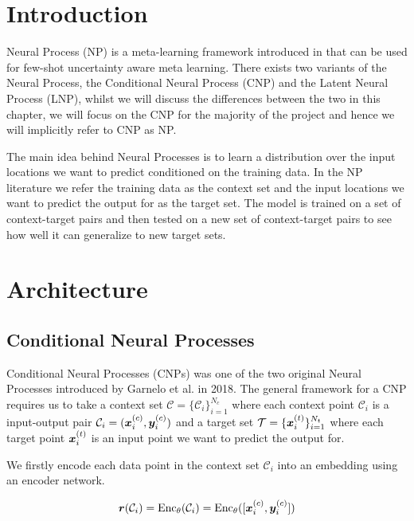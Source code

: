 \documentclass[../../main.tex]{subfiles}
\begin{document}
\section{Introduction}

Neural Process (NP) is a meta-learning framework introduced in \cite{garnelo2018conditional, garnelo2018neural} that can be used for few-shot uncertainty aware meta learning. There exists two variants of the Neural Process, the Conditional Neural Process (CNP) and the Latent Neural Process (LNP), whilst we will discuss the differences between the two in this chapter, we will focus on the CNP for the majority of the project and hence we will implicitly refer to CNP as NP. 

The main idea behind Neural Processes is to learn a distribution over the input locations we want to predict conditioned on the training data. In the NP literature we refer the training data as the context set and the input locations we want to predict the output for as the target set. The model is trained on a set of context-target pairs and then tested on a new set of context-target pairs to see how well it can generalize to new target sets.

\section{Architecture}

\subsection{Conditional Neural Processes}

Conditional Neural Processes (CNPs) \cite{garnelo2018conditional} was one of the two original Neural Processes introduced by Garnelo et al. in 2018. The general framework for a CNP requires us to take a context set $\mathcal{C} = \{ \mathcal{C}_i \}_{i=1}^{N_c}$ where each context point $\mathcal{C}_i$ is a input-output pair $\mathcal{C}_i = (\bm{x}_{i}^{(c)}, \bm{y}_i^{(c)}) $ and a target set $\mathcal{T} = \{ \bm{x}_{i}^{(t)} \}_{i=1}^{N_t}$ where each target point $\bm{x}_{i}^{(t)}$ is an input point we want to predict the output for.

We firstly encode each data point in the context set $\mathcal{C}_i$ into an embedding using an encoder network.


\begin{equation}
    \bm{r}(\mathcal{C}_i) = \text{Enc}_\theta(\mathcal{C}_i) = \text{Enc}_\theta( [\bm{x}_{i}^{(c)}, \bm{y}_i^{(c)}] )
\end{equation}
\end{document}
